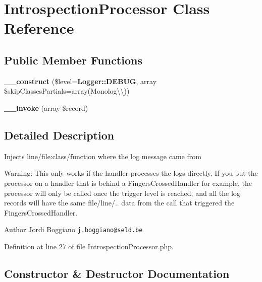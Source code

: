 \section{Introspection\+Processor Class Reference}
\label{class_monolog_1_1_processor_1_1_introspection_processor}
\subsection*{Public Member Functions}
\begin{DoxyCompactItemize}
\item 
{\bf \+\_\+\+\_\+construct} (\$level={\bf Logger\+::\+D\+E\+B\+U\+G}, array \$skip\+Classes\+Partials=array(\textquotesingle{}Monolog\textbackslash{}\textbackslash{}\textquotesingle{}))
\item 
{\bf \+\_\+\+\_\+invoke} (array \$record)
\end{DoxyCompactItemize}


\subsection{Detailed Description}
Injects line/file\+:class/function where the log message came from

Warning\+: This only works if the handler processes the logs directly. If you put the processor on a handler that is behind a Fingers\+Crossed\+Handler for example, the processor will only be called once the trigger level is reached, and all the log records will have the same file/line/.. data from the call that triggered the Fingers\+Crossed\+Handler.

\begin{DoxyAuthor}{Author}
Jordi Boggiano {\tt j.\+boggiano@seld.\+be} 
\end{DoxyAuthor}


Definition at line 27 of file Introspection\+Processor.\+php.



\subsection{Constructor \& Destructor Documentation}
